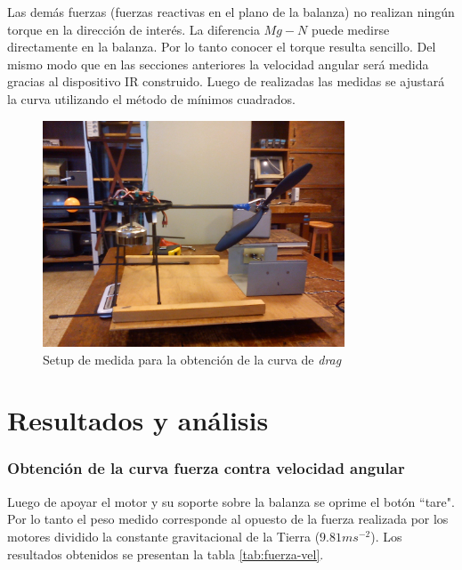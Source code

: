 \documentclass[spanish,12pt,a4paper,titlepage]{report}
\begin{document}
Las demás fuerzas (fuerzas reactivas en el plano de la balanza) no realizan ningún torque en la dirección de interés. La diferencia $Mg-N$ puede medirse directamente en la balanza. Por lo tanto conocer el torque resulta sencillo. Del mismo modo que en las secciones anteriores la velocidad angular será medida gracias al dispositivo IR construido. Luego de realizadas las medidas se ajustará la curva utilizando el método de mínimos cuadrados. 
\begin{figure}
  \vspace{-20pt}
  \begin{center}
    \includegraphics[width=0.8\textwidth]{./Pics/quad.jpg}
  \end{center}
  \vspace{-20pt}
  \caption{Setup de medida para la obtención de la curva de \emph{drag}}
  \label{fig:quad}
  \vspace{-10pt}
\end{figure}
\section{Resultados y análisis}

\subsubsection{Obtención de la curva fuerza contra velocidad angular}

Luego de apoyar el motor y su soporte sobre la balanza se oprime el botón ``tare". Por lo tanto el peso medido corresponde al opuesto de la fuerza realizada por los motores dividido la constante gravitacional de la Tierra ($9.81ms^{-2}$). Los resultados obtenidos se presentan la tabla \ref{tab:fuerza-vel}.
\end{document}
